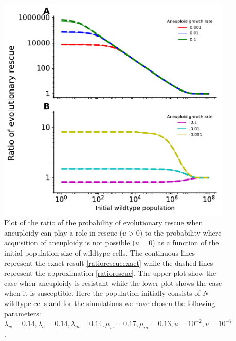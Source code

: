 \documentclass[12pt]{extarticle}
\begin{document}
\begin{figure}[!t]
 \vspace*{1\baselineskip}
\includegraphics[width=1\textwidth]{Figures/RatioEvolRescuePopulationSize.pdf}
\caption{Plot of the ratio of the probability of evolutionary rescue when aneuploidy can play a role in rescue ($u>0$) to the probability where acquisition of aneuploidy is not possible ($u=0$) as a function of the initial population size of wildtype cells. The continuous lines represent the exact result \eqref{ratiorescueexact} while the dashed lines represent the approximation \eqref{ratiorescue}. The upper plot show the case when aneuploidy is resistant while the lower plot shows the case when it is susceptible.  Here the population initially consists of $N$ wildtype cells and for the simulations we have chosen the following parameters: $\lambda_w=0.14, \lambda_a=0.14,\lambda_m=0.14,\mu_w=0.17,\mu_m=0.13, u=10^{-2}, v=10^{-7}$. }
\label{RatioEvolRescuePopulationSize}
\end{figure}
\end{document}
